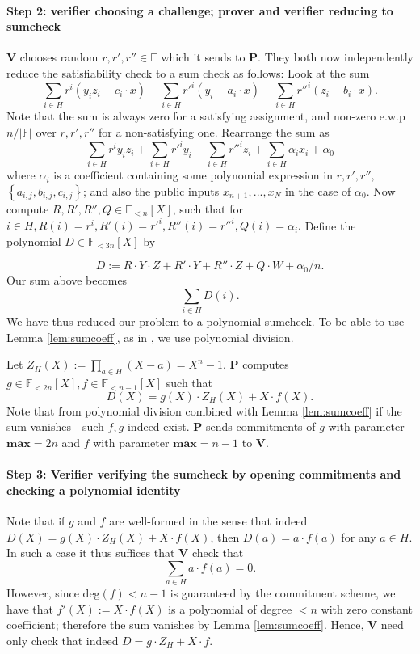 \documentclass[11pt]{article}
\numberwithin{figure}{section} %
\renewcommand{\max}{\ensuremath{\mathrm{\mathbf{max}}}\xspace}
\newcommand{\summ}{\ensuremath{\sum_{i\in H}}\xspace}
\newcommand{\summa}{\ensuremath{\sum_{a\in H}}\xspace}
\newcommand{\set}[1]{\ensuremath{\left\{#1\right\}}\xspace}
\newcommand{\F}{\ensuremath{\mathbb F}\xspace}
\renewcommand{\deg}{\ensuremath{\mathrm{deg}}\xspace}
\newcommand{\defeq}{:=}
\newcommand{\prv}{\ensuremath{\mathsf{\mathbf{P}}}\xspace}
\newcommand{\ver}{\ensuremath{\mathsf{\mathbf{V}}}\xspace}
\newcommand{\polysofdeg}[1]{\ensuremath{\F_{< #1}[X]}\xspace}
\begin{document}
\paragraph{Step 2: verifier choosing a challenge; prover and verifier reducing to sumcheck}
\ver chooses random $r, r',r'' \in \F$ which it sends to \prv.
They both now independently reduce the satisfiability check to a sum check as follows:
Look at the sum
\[\summ r^i(y_iz_i - c_i\cdot x) + \summ r'^i(y_i - a_i\cdot x) + \summ r''^i(z_i - b_i
\cdot x).\]
Note that the sum is always zero for a satisfying assignment, and non-zero e.w.p $n/|\F|$ over $r, r', r''$ for a non-satisfying one.
Rearrange the sum as
\[\summ r^iy_iz_i +\summ r'^iy_i +\summ r''^i z_i +\summ \alpha_ix_i + \alpha_0\]
where $\alpha_i$ is a coefficient containing some polynomial expression in $r, r'
, r'',$  $\set{a_{i,j} , b_{i,j} , c_{i,j}}$; and also
the public inputs $x_{n+1}, . . . , x_N$ in the case of $\alpha_0$.
Now compute $R, R', R'', Q \in \polysofdeg{n}$, such that for $i \in H, R(i) = r^i
, R'(i) = r'^i
, R''(i) =r''^i
, Q(i) = \alpha_i.$
Define the polynomial $D \in \polysofdeg{3n}$ by

\[D \defeq R \cdot Y \cdot Z + R'\cdot Y + R''\cdot Z + Q \cdot W + \alpha_0/n.\]
Our sum above becomes
\[\summ D(i).\]
We have thus reduced our problem to a polynomial sumcheck. To be able to use Lemma \ref{lem:sumcoeff}, as in \cite{aurora}, we use polynomial division.

Let $Z_H(X) \defeq \prod_{a\in H}(X - a)=X^n-1$.
\prv computes $g \in \polysofdeg{2n}, f \in \polysofdeg{n-1}$ such that
\[D(X) = g(X) \cdot Z_H(X) + X \cdot f(X).\]
Note that from polynomial division combined with Lemma \ref{lem:sumcoeff} if the sum vanishes - such $f, g$
indeed exist.
\prv sends commitments of $g$ with parameter $\max=2n$ and $f$ with parameter $\max=n-1$ to \ver.
\paragraph{Step 3: Verifier verifying the sumcheck by opening commitments and checking a
polynomial identity}
Note that if $g$ and $f$ are well-formed in the sense that indeed $D(X) =
g(X) \cdot Z_H(X) + X \cdot f(X)$, then $D(a) = a \cdot f(a)$ for any $a \in H$. In such a case it thus suffices that
\ver check that
\[\summa a \cdot f(a) = 0.\]
However, since $\deg(f) < n - 1$ is guaranteed by the commitment scheme, we have that $f'(X) \defeq X \cdot f(X)$ is a polynomial of degree $< n$ with zero constant coefficient; therefore the sum vanishes
by Lemma \ref{lem:sumcoeff}.
Hence, \ver need only check that indeed
$D = g \cdot Z_H + X \cdot f$.
\end{document}
